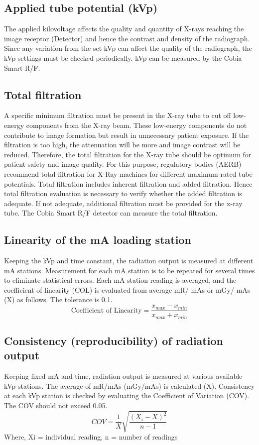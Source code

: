 \subsection{Applied tube potential (kVp)}
The applied kilovoltage affects the quality and quantity of X-rays reaching the image receptor (Detector) and hence the contrast and density of the radiograph. Since any variation from the set kVp can affect the quality of the radiograph, the kVp settings must be checked periodically. kVp can be measured by the Cobia Smart R/F.

\subsection{Total filtration}
A specific minimum filtration must be present in the X-ray tube to cut off low-energy components from the X-ray beam. These low-energy components do not contribute to image formation but result in unnecessary patient exposure. If the filtration is too high, the attenuation will be more and image contrast will be reduced. Therefore, the total filtration for the X-ray tube should be optimum for patient safety and image quality. For this purpose, regulatory bodies (AERB) recommend total filtration for X-Ray machines for different maximum-rated tube potentials. Total filtration includes inherent filtration and added filtration. Hence total filtration evaluation is necessary to verify whether the added filtration is adequate. If not adequate, additional filtration must be provided for the x-ray tube. The Cobia Smart R/F detector can measure the total filtration.

\subsection{Linearity of the mA loading station}
Keeping the kVp and time constant, the radiation output is measured at different mA stations.
Measurement for each mA station is to be repeated for several times to eliminate statistical errors.
Each mA station reading is averaged, and the coefficient of linearity (COL) is evaluated from average
mR/ mAs or mGy/ mAs (X) as follows. The tolerance is 0.1.
\[ \text{Coefficient of Linearity}= \frac{x_{max} - x_{min}}{x_{max} + x_{min}}\]

\subsection{Consistency (reproducibility) of radiation output}
Keeping fixed mA and time, radiation output is measured at various available kVp stations. The
average of mR/mAs (mGy/mAs) is calculated (X). Consistency at each kVp station is checked by
evaluating the Coefficient of Variation (COV). The COV should not exceed 0.05.
\[COV = \frac{1}{X}\sqrt{\frac{(X_i - X)^2}{n-1}}\]
Where, Xi = individual reading, n = number of readings


